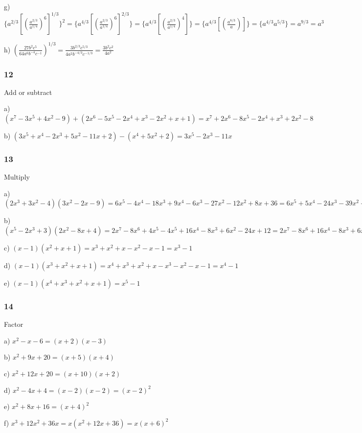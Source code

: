 \documentclass[]{report}
\begin{document}
g) $\{a^{2/3} [(\frac{a^{2/3}}{a^{1/4}})^6]^{1/3}\}^2 = \{a^{4/3} [(\frac{a^{2/3}}{a^{1/4}})^6]^{2/3}\} = \{a^{4/3} [(\frac{a^{2/3}}{a^{1/4}})^4]\} = \{a^{4/3} [(\frac{a^{8/3}}{a})]\} =  \{a^{4/3} a^{5/3}\} = a^{9/3} = a^3$

h) $(\frac{27b^2c^5}{64a^6b^{-4}c^{-1}})^{1/3} =  \frac{3b^{2/3}c^{5/3}}{4a^2b^{-4/3}c^{-1/3}} = \frac{3b^2c^2}{4a^2}$



\subsubsection{12}

Add or subtract


a) $(x^7 - 3x^5 + 4x^2 - 9) + (2x^6 - 5x^5 - 2x^4 + x^3 - 2x^2 + x + 1) = x^7 + 2x^6 - 8x^5 - 2x^4 + x^3 + 2x^2 - 8$

b) $(3x^5 + x^4 - 2x^3 + 5x^2 - 11x + 2) - (x^4 + 5x^2 + 2) = 3x^5 - 2x^3 - 11x$


\subsubsection{13}
Multiply

a) $(2x^3 + 3x^2 - 4)(3x^2 - 2x - 9) = 6x^5 - 4x^4 - 18x^3 + 9x^4 - 6x^3 - 27x^2 - 12x^2 + 8x + 36 = 6x^5 + 5x^4 - 24x^3 - 39x^2 + 8x + 36$

b) $(x^5 - 2x^3 + 3)(2x^2 - 8x + 4) = 2x^7 - 8x^6 + 4x^5 - 4x^5 + 16x^4 - 8x^3 + 6x^2 - 24x + 12 =  2x^7 - 8x^6 + 16x^4 - 8x^3 + 6x^2 - 24x + 12$

c) $(x-1)(x^2 + x + 1) = x^3 + x^2 + x - x^2 - x - 1 = x^3 - 1$

d) $(x-1)(x^3 + x^2 + x + 1) = x^4 + x^3 + x^2 + x - x^3 - x^2 - x - 1 = x^4 -1$

e) $(x-1)(x^4+x^3+x^2+x+1) = x^5 - 1$

\subsubsection{14}

Factor 

a) $x^2 -x - 6 = (x+2)(x-3)$

b) $x^2 + 9x + 20 = (x + 5)(x + 4)$

c) $x^2 + 12x + 20 = (x + 10)(x + 2)$

d) $x^2 -4x + 4 = (x-2)(x-2) = (x-2)^2$

e) $x^2 + 8x + 16 = (x+4)^2$

f) $x^3 + 12x^2 + 36x = x(x^2 + 12x + 36) = x(x+6)^2$
\end{document}
